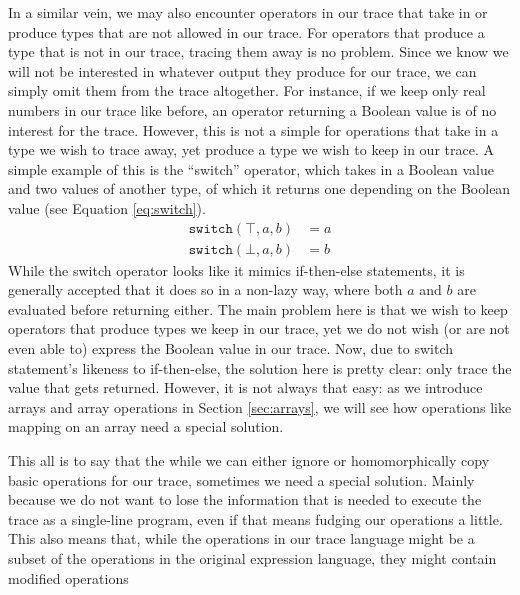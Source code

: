     In a similar vein, we may also encounter operators in our trace that take in or produce types that are not allowed in our trace.
    For operators that produce a type that is not in our trace, tracing them away is no problem.
    Since we know we will not be interested in whatever output they produce for our trace, we can simply omit them from the trace altogether.
    For instance, if we keep only real numbers in our trace like before, an operator returning a Boolean value is of no interest for the trace.
    However, this is not a simple for operations that take in a type we wish to trace away, yet produce a type we wish to keep in our trace.
    A simple example of this is the ``switch'' operator, which takes in a Boolean value and two values of another type, of which it returns one depending on the Boolean value (see Equation \ref{eq:switch}).
    \begin{equation}
        \begin{aligned}
            \texttt{switch}(\top,a,b)&=a\\
            \texttt{switch}(\bot,a,b)&=b
        \end{aligned}
        \label{eq:switch}
    \end{equation}
    While the switch operator looks like it mimics if-then-else statements, it is generally accepted that it does so in a non-lazy way, where both $a$ and $b$ are evaluated before returning either.
    The main problem here is that we wish to keep operators that produce types we keep in our trace, yet we do not wish (or are not even able to) express the Boolean value in our trace.
    Now, due to switch statement's likeness to if-then-else, the solution here is pretty clear: only trace the value that gets returned.
    However, it is not always that easy: as we introduce arrays and array operations in Section \ref{sec:arrays}, we will see how operations like mapping on an array need a special solution.
    
    This all is to say that the while we can either ignore or homomorphically copy basic operations for our trace, sometimes we need a special solution.
    Mainly because we do not want to lose the information that is needed to execute the trace as a single-line program, even if that means fudging our operations a little.
    This also means that, while the operations in our trace language might be a subset of the operations in the original expression language, they might contain modified operations

